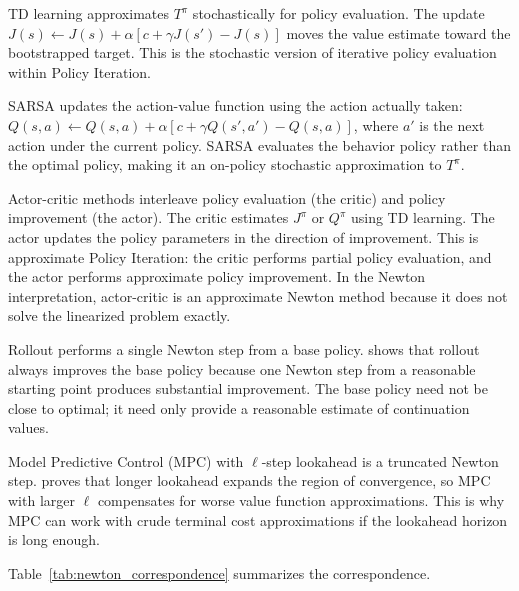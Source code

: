 TD learning approximates $T^\pi$ stochastically for policy evaluation. The update $J(s) \leftarrow J(s) + \alpha[c + \gamma J(s') - J(s)]$ moves the value estimate toward the bootstrapped target. This is the stochastic version of iterative policy evaluation within Policy Iteration.

SARSA updates the action-value function using the action actually taken: $Q(s,a) \leftarrow Q(s,a) + \alpha[c + \gamma Q(s',a') - Q(s,a)]$, where $a'$ is the next action under the current policy. SARSA evaluates the behavior policy rather than the optimal policy, making it an on-policy stochastic approximation to $T^\pi$.

Actor-critic methods interleave policy evaluation (the critic) and policy improvement (the actor). The critic estimates $J^\pi$ or $Q^\pi$ using TD learning. The actor updates the policy parameters in the direction of improvement. This is approximate Policy Iteration: the critic performs partial policy evaluation, and the actor performs approximate policy improvement. In the Newton interpretation, actor-critic is an approximate Newton method because it does not solve the linearized problem exactly.

Rollout performs a single Newton step from a base policy. \citet{bertsekas2024} shows that rollout always improves the base policy because one Newton step from a reasonable starting point produces substantial improvement. The base policy need not be close to optimal; it need only provide a reasonable estimate of continuation values.

Model Predictive Control (MPC) with $\ell$-step lookahead is a truncated Newton step. \citet{bertsekas2024} proves that longer lookahead expands the region of convergence, so MPC with larger $\ell$ compensates for worse value function approximations. This is why MPC can work with crude terminal cost approximations if the lookahead horizon is long enough.

Table~\ref{tab:newton_correspondence} summarizes the correspondence.

